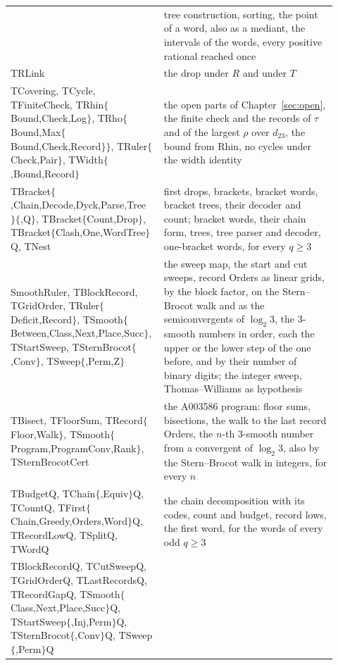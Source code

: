 \documentclass[10pt,a4paper,titlepage]{article}
\newcommand{\lean}[1]{\textsf{#1}}
\begin{document}
\begin{table}[p]
\begin{tabular}{@{}>{\raggedright\arraybackslash}p{0.42\linewidth}>{\raggedright\arraybackslash}p{0.5\linewidth}@{}}
  & tree construction, sorting, the point of a word, also as a mediant, the intervals of the words, every positive rational reached once \\
\lean{TRLink}
  & the drop under $R$ and under $T$ \\
\lean{TCovering}, \lean{TCycle}, \lean{TFiniteCheck}, \lean{TRhin$\{$Bound,Check,Log$\}$}, \lean{TRho$\{$Bound,Max$\{$Bound,Check,Record$\}\}$}, \lean{TRuler$\{$Check,Pair$\}$}, \lean{TWidth$\{$,Bound,Record$\}$}
  & the open parts of Chapter~\ref{sec:open}, the finite check and the records of $\tau$ and of the largest $\rho$ over $d_{23}$, the bound from Rhin, no cycles under the width identity \\
\lean{TBracket$\{$,Chain,Decode,Dyck,Parse,Tree$\}\{$,Q$\}$}, \lean{TBracket$\{$Count,Drop$\}$}, \lean{TBracket$\{$Clash,One,WordTree$\}$Q}, \lean{TNest}
  & first drops, brackets, bracket words, bracket trees, their decoder and count; bracket words, their chain form, trees, tree parser and decoder, one-bracket words, for every $q \ge 3$ \\
\lean{SmoothRuler}, \lean{TBlockRecord}, \lean{TGridOrder}, \lean{TRuler$\{$Deficit,Record$\}$}, \lean{TSmooth$\{$Between,Class,Next,Place,Succ$\}$}, \lean{TStartSweep}, \lean{TSternBrocot$\{$,Conv$\}$}, \lean{TSweep$\{$,Perm,Z$\}$}
  & the sweep map, the start and cut sweeps, record Orders as linear grids, by the block factor, on the Stern--Brocot walk and as the semiconvergents of $\log_2 3$, the $3$-smooth numbers in order, each the upper or the lower step of the one before, and by their number of binary digits; the integer sweep, Thomas--Williams as hypothesis \\
\lean{TBisect}, \lean{TFloorSum}, \lean{TRecord$\{$Floor,Walk$\}$}, \lean{TSmooth$\{$Program,ProgramConv,Rank$\}$}, \lean{TSternBrocotCert}
  & the A003586 program: floor sums, bisections, the walk to the last record Orders, the $n$-th $3$-smooth number from a convergent of $\log_2 3$, also by the Stern--Brocot walk in integers, for every $n$ \\
\lean{TBudgetQ}, \lean{TChain$\{$,Equiv$\}$Q}, \lean{TCountQ}, \lean{TFirst$\{$Chain,Greedy,Orders,Word$\}$Q}, \lean{TRecordLowQ}, \lean{TSplitQ}, \lean{TWordQ}
  & the chain decomposition with its codes, count and budget, record lows, the first word, for the words of every odd $q \ge 3$ \\
\lean{TBlockRecordQ}, \lean{TCutSweepQ}, \lean{TGridOrderQ}, \lean{TLastRecordsQ}, \lean{TRecordGapQ}, \lean{TSmooth$\{$Class,Next,Place,Succ$\}$Q}, \lean{TStartSweep$\{$,Inj,Perm$\}$Q}, \lean{TSternBrocot$\{$,Conv$\}$Q}, \lean{TSweep$\{$,Perm$\}$Q}

\end{tabular}
\end{table}
\end{document}

